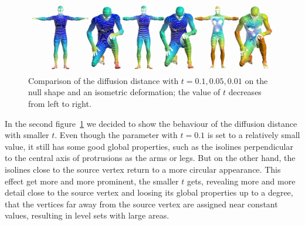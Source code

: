 \begin{figure}[h]
	\centering
	\includegraphics[width = \textwidth]{../results/diffusion_isolines_smaller_t}
	\caption{Comparison of the diffusion distance with $t = 0.1, 0.05, 0.01$ on the null shape and an isometric deformation; the value of $t$ decreases from left to right.}
	\label{fig:diffusion_s_isolines}
\end{figure}
In the second figure~\ref{fig:diffusion_s_isolines} we decided to show the behaviour of the diffusion distance with smaller $t$.
Even though the parameter with $t= 0.1$ is set to a relatively small value, it still has some good global properties, such as the isolines perpendicular to the central axis of protrusions as the arms or legs.
But on the other hand, the isolines close to the source vertex return to a more circular appearance.
This effect get more and more prominent, the smaller $t$ gets, revealing more and more detail close to the source vertex and loosing its global properties up to a degree, that the vertices far away from the source vertex are assigned near constant values, resulting in level sets with large areas.

